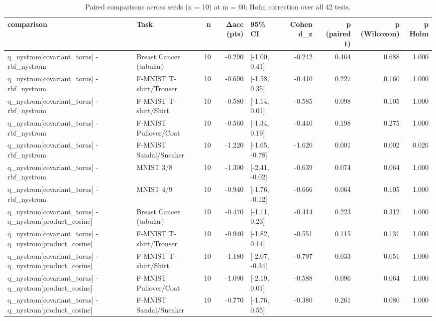 \begin{table}
\caption{Paired comparisons across seeds (n = 10) at m = 60; Holm correction over all 42 tests.}
\label{tab:table_stats_main}
\begin{tabular}{llrrlrrrr}
\toprule
comparison & Task & n & Δacc (pts) & 95\% CI & Cohen d\_z & p (paired t) & p (Wilcoxon) & p Holm \\
\midrule
q\_nystrom[covariant\_torus] - rbf\_nystrom & Breast Cancer (tabular) & 10 & -0.290 & [-1.00, 0.41] & -0.242 & 0.464 & 0.688 & 1.000 \\
q\_nystrom[covariant\_torus] - rbf\_nystrom & F-MNIST T-shirt/Trouser & 10 & -0.690 & [-1.58, 0.35] & -0.410 & 0.227 & 0.160 & 1.000 \\
q\_nystrom[covariant\_torus] - rbf\_nystrom & F-MNIST T-shirt/Shirt & 10 & -0.580 & [-1.14, 0.01] & -0.585 & 0.098 & 0.105 & 1.000 \\
q\_nystrom[covariant\_torus] - rbf\_nystrom & F-MNIST Pullover/Coat & 10 & -0.560 & [-1.34, 0.19] & -0.440 & 0.198 & 0.275 & 1.000 \\
q\_nystrom[covariant\_torus] - rbf\_nystrom & F-MNIST Sandal/Sneaker & 10 & -1.220 & [-1.65, -0.78] & -1.620 & 0.001 & 0.002 & 0.026 \\
q\_nystrom[covariant\_torus] - rbf\_nystrom & MNIST 3/8 & 10 & -1.300 & [-2.41, -0.02] & -0.639 & 0.074 & 0.064 & 1.000 \\
q\_nystrom[covariant\_torus] - rbf\_nystrom & MNIST 4/9 & 10 & -0.940 & [-1.76, -0.12] & -0.666 & 0.064 & 0.105 & 1.000 \\
q\_nystrom[covariant\_torus] - q\_nystrom[product\_cosine] & Breast Cancer (tabular) & 10 & -0.470 & [-1.11, 0.23] & -0.414 & 0.223 & 0.312 & 1.000 \\
q\_nystrom[covariant\_torus] - q\_nystrom[product\_cosine] & F-MNIST T-shirt/Trouser & 10 & -0.940 & [-1.82, 0.14] & -0.551 & 0.115 & 0.131 & 1.000 \\
q\_nystrom[covariant\_torus] - q\_nystrom[product\_cosine] & F-MNIST T-shirt/Shirt & 10 & -1.180 & [-2.07, -0.34] & -0.797 & 0.033 & 0.051 & 1.000 \\
q\_nystrom[covariant\_torus] - q\_nystrom[product\_cosine] & F-MNIST Pullover/Coat & 10 & -1.090 & [-2.19, 0.01] & -0.588 & 0.096 & 0.064 & 1.000 \\
q\_nystrom[covariant\_torus] - q\_nystrom[product\_cosine] & F-MNIST Sandal/Sneaker & 10 & -0.770 & [-1.76, 0.55] & -0.380 & 0.261 & 0.080 & 1.000 \\

\end{tabular}
\end{table}
